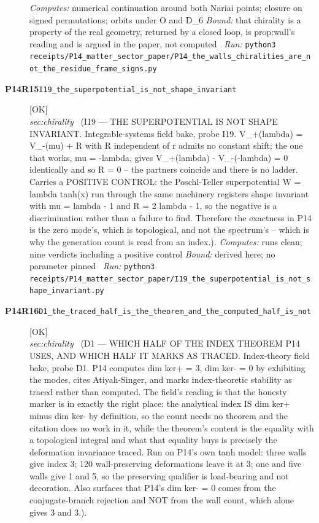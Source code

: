 \begin{description}
\emph{Computes:} numerical continuation around both Nariai points; closure on signed permutations; orbits under O and D\_6
 \emph{Bound:} that chirality is a property of the real geometry, returned by a closed loop, is prop:wall's reading and is argued in the paper, not computed
\ \emph{Run:} \texttt{python3 receipts/P14\_matter\_sector\_paper/P14\_the\_walls\_chiralities\_are\_not\_the\_residue\_frame\_signs.py}
\item[\rcptlabel{I19_the_superpotential_is_not_shape_invariant}{P14R15}\textbf{P14R15}\quad\texttt{I19\_the\_superpotential\_is\_not\_shape\_invariant}]\hfill\textsf{[OK]}\\
\textit{sec:chirality} \ (I19 --- THE SUPERPOTENTIAL IS NOT SHAPE INVARIANT. Integrable-systems field bake, probe I19. V\_+(lambda) = V\_-(mu) + R with R independent of r admits no constant shift; the one that works, mu = -lambda, gives V\_+(lambda) - V\_-(-lambda) = 0 identically and so R = 0 -- the partners coincide and there is no ladder. Carries a POSITIVE CONTROL: the Poschl-Teller superpotential W = lambda tanh(x) run through the same machinery registers shape invariant with mu = lambda - 1 and R = 2 lambda - 1, so the negative is a discrimination rather than a failure to find. Therefore the exactness in P14 is the zero mode's, which is topological, and not the spectrum's -- which is why the generation count is read from an index.). 
\emph{Computes:} runs clean; nine verdicts including a positive control
 \emph{Bound:} derived here; no parameter pinned
\ \emph{Run:} \texttt{python3 receipts/P14\_matter\_sector\_paper/I19\_the\_superpotential\_is\_not\_shape\_invariant.py}
\item[\rcptlabel{D1_the_traced_half_is_the_theorem_and_the_computed_half_is_not}{P14R16}\textbf{P14R16}\quad\texttt{D1\_the\_traced\_half\_is\_the\_theorem\_and\_the\_computed\_half\_is\_not}]\hfill\textsf{[OK]}\\
\textit{sec:chirality} \ (D1 --- WHICH HALF OF THE INDEX THEOREM P14 USES, AND WHICH HALF IT MARKS AS TRACED. Index-theory field bake, probe D1. P14 computes dim ker+ = 3, dim ker- = 0 by exhibiting the modes, cites Atiyah-Singer, and marks index-theoretic stability as traced rather than computed. The field's reading is that the honesty marker is in exactly the right place: the analytical index IS dim ker+ minus dim ker- by definition, so the count needs no theorem and the citation does no work in it, while the theorem's content is the equality with a topological integral and what that equality buys is precisely the deformation invariance traced. Run on P14's own tanh model: three walls give index 3; 120 wall-preserving deformations leave it at 3; one and five walls give 1 and 5, so the preserving qualifier is load-bearing and not decoration. Also surfaces that P14's dim ker- = 0 comes from the conjugate-branch rejection and NOT from the wall count, which alone gives 3 and 3.). 

\end{description}
